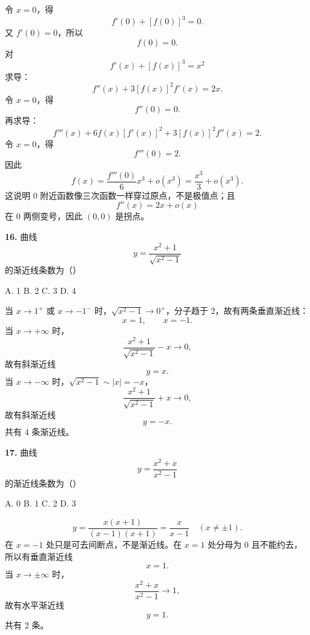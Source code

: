 \begin{solutionblock}
令 \(x=0\)，得
\[
f'(0)+[f(0)]^3=0.
\]
又 \(f'(0)=0\)，所以
\[
f(0)=0.
\]
对
\[
f'(x)+[f(x)]^3=x^2
\]
求导：
\[
f''(x)+3[f(x)]^2f'(x)=2x.
\]
令 \(x=0\)，得
\[
f''(0)=0.
\]
再求导：
\[
f'''(x)+6f(x)[f'(x)]^2+3[f(x)]^2f''(x)=2.
\]
令 \(x=0\)，得
\[
f'''(0)=2.
\]
因此
\[
f(x)=\frac{f'''(0)}{6}x^3+o(x^3)=\frac{x^3}{3}+o(x^3).
\]
这说明 0 附近函数像三次函数一样穿过原点，不是极值点；且
\[
f''(x)=2x+o(x)
\]
在 0 两侧变号，因此 \((0,0)\) 是拐点。

\end{solutionblock}

\begin{problemblock}
\textbf{16.} 曲线
\[
y=\frac{x^2+1}{\sqrt{x^2-1}}
\]
的渐近线条数为（\quad）

A. 1 \qquad B. 2 \qquad C. 3 \qquad D. 4
\end{problemblock}

\begin{solutionblock}
当 \(x\to1^+\) 或 \(x\to-1^-\) 时，\(\sqrt{x^2-1}\to0^+\)，分子趋于 2，故有两条垂直渐近线：
\[
x=1,\qquad x=-1.
\]
当 \(x\to+\infty\) 时，
\[
\frac{x^2+1}{\sqrt{x^2-1}}-x\to0,
\]
故有斜渐近线
\[
y=x.
\]
当 \(x\to-\infty\) 时，\(\sqrt{x^2-1}\sim |x|=-x\)，
\[
\frac{x^2+1}{\sqrt{x^2-1}}+x\to0,
\]
故有斜渐近线
\[
y=-x.
\]
共有 4 条渐近线。

\end{solutionblock}

\begin{problemblock}
\textbf{17.} 曲线
\[
y=\frac{x^2+x}{x^2-1}
\]
的渐近线条数为（\quad）

A. 0 \qquad B. 1 \qquad C. 2 \qquad D. 3
\end{problemblock}

\begin{solutionblock}
\[
y=\frac{x(x+1)}{(x-1)(x+1)}=\frac{x}{x-1}\quad(x\ne\pm1).
\]
在 \(x=-1\) 处只是可去间断点，不是渐近线。在 \(x=1\) 处分母为 0 且不能约去，所以有垂直渐近线
\[
x=1.
\]
当 \(x\to\pm\infty\) 时，
\[
\frac{x^2+x}{x^2-1}\to1,
\]
故有水平渐近线
\[
y=1.
\]
共有 2 条。

\end{solutionblock}

